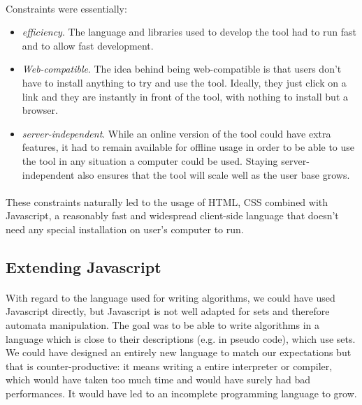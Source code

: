 \documentclass{article}
\begin{document}
\begin{sloppypar}
\paragraph{}
Constraints were essentially:
       
\begin{itemize}
	\item{ {\em efficiency}. The language and libraries used to develop the tool had to run fast and to allow fast development.}
	\item{ {\em Web-compatible}. The idea behind being web-compatible is that users don’t have to install anything to try and use the tool. Ideally, they just click on a link and they are instantly in front of the tool, with nothing to install but a browser.}
	\item{ {\em server-independent}. While an online version of the tool could have extra features, it had to remain available for offline usage in order to be able to use the tool in any situation a computer could be used. Staying server-independent also ensures that the tool will scale well as the user base grows.}
\end{itemize}

\paragraph{}
These constraints naturally led to the usage of HTML, CSS combined with Javascript, a reasonably fast and widespread client-side language that doesn’t need any special installation on user’s computer to run.
   
   
   

\subsection{ Extending Javascript}


\paragraph{}
With regard to the language used for writing algorithms, we could have used Javascript directly, but Javascript is not well adapted for sets and therefore automata manipulation. The goal was to be able to write algorithms in a language which is close to their descriptions (e.g. in pseudo code), which use sets. We could have designed an entirely new language to match our expectations but that is counter-productive: it means writing a entire interpreter or compiler, which would have taken too much time and would have surely had bad performances. It would have led to an incomplete programming language to grow.
      

\end{sloppypar}
\end{document}
